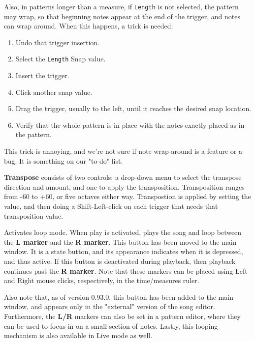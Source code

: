    Also, in patterns longer than a measure, if \texttt{Length} is not selected,
   the pattern may wrap, so that beginning notes appear at the end of the
   trigger, and notes can wrap around.  When this happens, a trick is needed:

   \begin{enumerate}
      \item Undo that trigger insertion.
      \item Select the \texttt{Length} Snap value.
      \item Insert the trigger.
      \item Click another snap value.
      \item Drag the trigger, usually to the left, until it reaches the
         desired snap location.
      \item Verify that the whole pattern is in place with the notes exactly
         placed as in the pattern.
   \end{enumerate}

   This trick is annoying, and we're not sure if note wrap-around
   is a feature or a bug.
   It is something on our "to-do" list.

   \textbf{Transpose} consists of two controls:
   a drop-down menu to select the transpose direction and amount,
   and one to apply the transposition.
   Transposition ranges from -60 to +60, or five octaves either way.
   Transpostion is applied by setting the value, and then doing
   a Shift-Left-click on each trigger that needs that transposition value.

   Activates loop mode. When play is activated, plays the song and loop
   between the
   \textbf{L marker} and the \textbf{R marker}.
   This button has been moved to the main window.
   It is a state button, and its appearance indicates when it is
   depressed, and thus active.
   If this button is deactivated during playback, then playback
   continues past the \textbf{R marker}.
   Note that these markers can be placed using Left
   and Right mouse clicks, respectively, in the time/measures ruler.

   Also note that, as of version 0.93.0, this button has been added to the main
   window, and appears only in the "external" version of the song editor.
   Furthermore, the \textbf{L/R} markers can also be set in a pattern editor,
   where they can be used to focus in on a small section of notes.
   Lastly, this looping mechanism is also available in Live mode as well.

